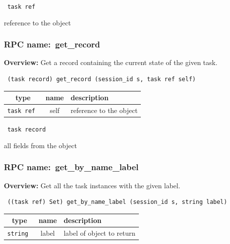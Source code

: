 \vspace{0.3cm}

{\tt 
task ref
}


reference to the object
\vspace{0.3cm}
\vspace{0.3cm}
\vspace{0.3cm}
\subsubsection{RPC name:~get\_record}

{\bf Overview:} 
Get a record containing the current state of the given task.

\begin{verbatim} (task record) get_record (session_id s, task ref self)\end{verbatim}



 
\vspace{0.3cm}
\begin{tabular}{|c|c|p{7cm}|}
 \hline
{\bf type} & {\bf name} & {\bf description} \\ \hline
{\tt task ref } & self & reference to the object \\ \hline 

\end{tabular}

\vspace{0.3cm}

{\tt 
task record
}


all fields from the object
\vspace{0.3cm}
\vspace{0.3cm}
\vspace{0.3cm}
\subsubsection{RPC name:~get\_by\_name\_label}

{\bf Overview:} 
Get all the task instances with the given label.

\begin{verbatim} ((task ref) Set) get_by_name_label (session_id s, string label)\end{verbatim}



 
\vspace{0.3cm}
\begin{tabular}{|c|c|p{7cm}|}
 \hline
{\bf type} & {\bf name} & {\bf description} \\ \hline
{\tt string } & label & label of object to return \\ \hline 

\end{tabular}

